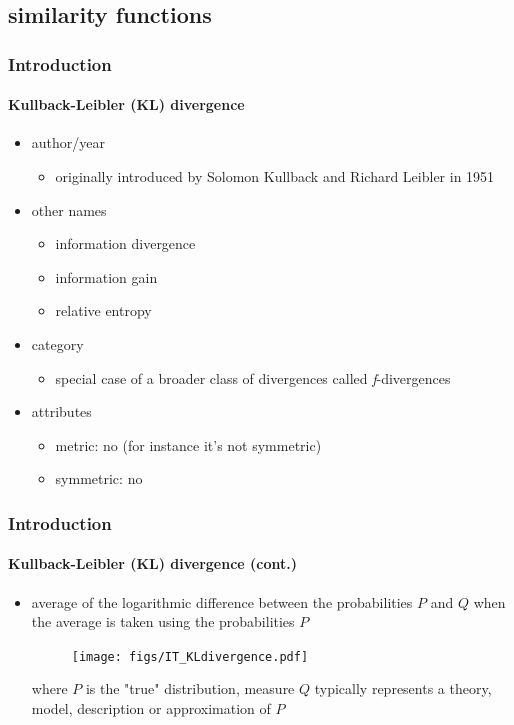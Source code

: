 \subsection{similarity functions}
\begin{frame}
\frametitle{Introduction}
\framesubtitle{Kullback-Leibler (KL) divergence}
\logoCSIPCPL\mypagenum
	\begin{itemize}
		\item {\color {red} author/year}
			\begin{itemize}				
				\item originally introduced by Solomon Kullback and Richard Leibler in 1951
			\end{itemize}
		\item {\color {red} other names}
			\begin{itemize}
				\item information divergence
				\item information gain
				\item relative entropy
			\end{itemize}
		\item {\color {red} category}
			\begin{itemize}
				\item special case of a broader class of divergences called \emph{f}-divergences
			\end{itemize}
		\item {\color {red} attributes}
			\begin{itemize}
				\item {\color {blue} metric}: no (for instance it's not symmetric)
				\item {\color {blue} symmetric}: no
			\end{itemize}
	\end{itemize}	
\end{frame}



\begin{frame}
\frametitle{Introduction}
\framesubtitle{Kullback-Leibler (KL) divergence (cont.)}
\logoCSIPCPL\mypagenum
	\begin{itemize}
		\item average of the logarithmic difference between the probabilities $P$ and $Q$ when the average is taken using the probabilities $P$
			\begin{figure}				
				\texttt{[image: figs/IT\_KLdivergence.pdf]}
			\end{figure}
		where $P$ is the "true" distribution, measure $Q$ typically represents a theory, model, description or approximation of $P$
	\end{itemize}	
\end{frame}



